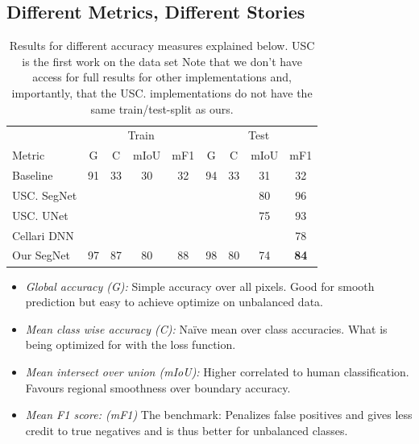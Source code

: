 \documentclass[
    ,title     = {{Image Segmentation for Smart Agriculture}}
    ,subject   = {{This is the subject of my work}}
    ,papersize = {{a1paper}}
    ,nocrop
]{dtuposter}
\begin{document}
\begin{dtupostercontent}
\section{Different Metrics, Different Stories}


\begin{table}
	\centering 
	\begin{tabular}{l|cccc|cccc}
		
		\rule[-1ex]{0pt}{2.5ex}  & \multicolumn{4}{c|}{Train} &  \multicolumn{4}{c|}{Test} \\ 
		
		\rule[-1ex]{0pt}{2.5ex} Metric  & G & C &mIoU&  mF1 & G & C & mIoU& mF1 \\ 
		\hline
		\rule[-1ex]{0pt}{2.5ex} Baseline& 91& 33 &30  &32  &94  &33  &31 &32  \\ 
		
		\rule[-1ex]{0pt}{2.5ex} USC. SegNet    &  &  &  &  &  & &   80 &96  \\ 
		\rule[-1ex]{0pt}{2.5ex} USC. UNet   &  &  &  &  &  & &75 &93  \\ 
		\rule[-1ex]{0pt}{2.5ex} Cellari DNN   &  &  &  &  &  & & &78  \\ 
		\hline 
		\rule[-1ex]{0pt}{2.5ex} Our SegNet & 97 & 87 & 80 &88  & 98  &80&74&\textbf{84}  \\ 
	\end{tabular} 
\caption{Results for different accuracy measures explained below. USC is the first work on the data set \cite{USC.} Note that we don't have access for full results for other implementations and, importantly, that the USC. implementations do not have the same train/test-split as ours.}
\end{table}

\begin{itemize}
	\item \textit{Global accuracy (G):} Simple accuracy over all pixels. Good for smooth prediction but easy to achieve optimize on unbalanced data.
	\item \textit{Mean class wise accuracy (C):} Naïve mean over class accuracies. What is being optimized for with the loss function.
	\item \textit{Mean intersect over union (mIoU):} Higher correlated to human classification. Favours regional smoothness over boundary accuracy.
	\item \textit{Mean F1 score: (mF1)} The benchmark: Penalizes false positives and gives less credit to true negatives and is thus better for unbalanced classes. 
\end{itemize}



\end{dtupostercontent}
\end{document}
